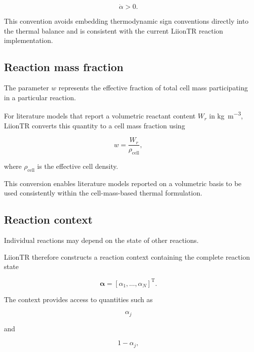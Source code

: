 \begin{equation}
    \dot{\alpha} > 0.
\end{equation}

This convention avoids embedding thermodynamic sign conventions directly
into the thermal balance and is consistent with the current LiionTR
reaction implementation.


\subsection{Reaction mass fraction}

The parameter $w$ represents the effective fraction of total cell mass
participating in a particular reaction.

For literature models that report a volumetric reactant content
$W_r$ in \si{\kilogram\per\meter\cubed}, LiionTR converts this quantity
to a cell mass fraction using

\begin{equation}
    w
    =
    \frac{
        W_r
    }{
        \rho_{\mathrm{cell}}
    },
    \label{eq:volumetric_to_mass_fraction}
\end{equation}

where $\rho_{\mathrm{cell}}$ is the effective cell density.

This conversion enables literature models reported on a volumetric basis
to be used consistently within the cell-mass-based thermal formulation.


\subsection{Reaction context}

Individual reactions may depend on the state of other reactions.

LiionTR therefore constructs a reaction context containing the complete
reaction state

\begin{equation}
    \boldsymbol{\alpha}
    =
    \left[
        \alpha_1,
        \ldots,
        \alpha_N
    \right]^{\mathrm{T}}.
\end{equation}

The context provides access to quantities such as

\begin{equation}
    \alpha_j
\end{equation}

and

\begin{equation}
    1-\alpha_j,
\end{equation}

